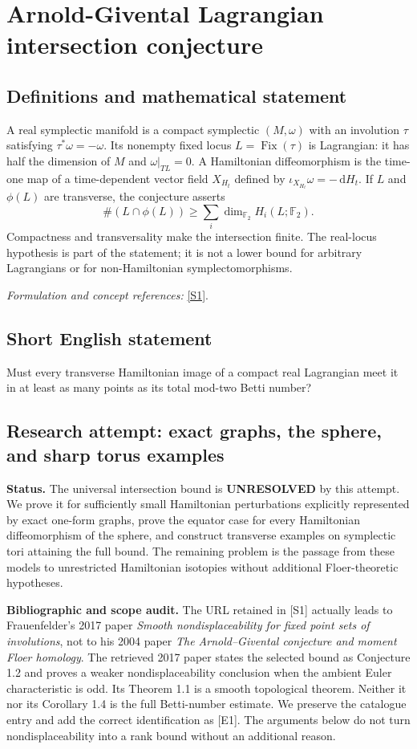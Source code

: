\documentclass[11pt]{article}
\begin{document}
\section*{\texorpdfstring{Arnold-Givental Lagrangian intersection conjecture}{Arnold-Givental Lagrangian intersection conjecture}}\label{30006902}
\subsection{Definitions and mathematical statement}
A real symplectic manifold is a compact symplectic $(M,\omega)$ with an involution $\tau$ satisfying $\tau^*\omega=-\omega$. Its nonempty fixed locus $L=\operatorname{Fix}(\tau)$ is Lagrangian: it has half the dimension of $M$ and $\omega|_{TL}=0$. A Hamiltonian diffeomorphism is the time-one map of a time-dependent vector field $X_{H_t}$ defined by $\iota_{X_{H_t}}\omega=-{\,\mathrm{d}} H_t$. If $L$ and $\phi(L)$ are transverse, the conjecture asserts
\[
 \#(L\cap\phi(L))\ge\sum_i\dim_{{\mathbb{F}}_2}H_i(L;{\mathbb{F}}_2).
\]
Compactness and transversality make the intersection finite. The real-locus hypothesis is part of the statement; it is not a lower bound for arbitrary Lagrangians or for non-Hamiltonian symplectomorphisms.
\par\smallskip\textit{Formulation and concept references:} \href{https://arxiv.org/html/1708.09628v1}{[S1]}.

\subsection{Short English statement}
Must every transverse Hamiltonian image of a compact real Lagrangian meet it in at least as many points as its total mod-two Betti number?
\subsection{Research attempt: exact graphs, the sphere, and sharp torus examples}
\textbf{Status.} The universal intersection bound is \textbf{UNRESOLVED} by this attempt. We prove it for sufficiently small Hamiltonian perturbations explicitly represented by exact one-form graphs, prove the equator case for every Hamiltonian diffeomorphism of the sphere, and construct transverse examples on symplectic tori attaining the full bound. The remaining problem is the passage from these models to unrestricted Hamiltonian isotopies without additional Floer-theoretic hypotheses.

\textbf{Bibliographic and scope audit.} The URL retained in [S1] actually leads to Frauenfelder's 2017 paper \emph{Smooth nondisplaceability for fixed point sets of involutions}, not to his 2004 paper \emph{The Arnold--Givental conjecture and moment Floer homology}. The retrieved 2017 paper states the selected bound as Conjecture 1.2 and proves a weaker nondisplaceability conclusion when the ambient Euler characteristic is odd. Its Theorem 1.1 is a smooth topological theorem. Neither it nor its Corollary 1.4 is the full Betti-number estimate. We preserve the catalogue entry and add the correct identification as [E1]. The arguments below do not turn nondisplaceability into a rank bound without an additional reason.
\end{document}
